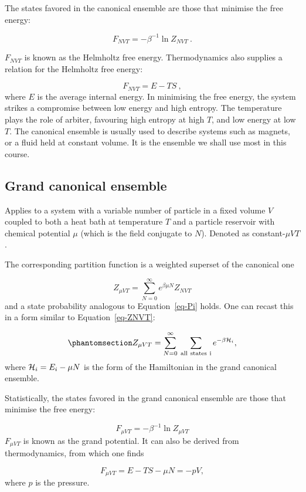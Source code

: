 \documentclass[
  letterpaper,
  enabledeprecatedfontcommands]{report}
\begin{document}
The states favored in the canonical ensemble are those that minimise the
free energy:

\[
F_{NVT}=-\beta^{-1}\ln Z_{NVT}\:.
\]

\(F_{NVT}\) is known as the Helmholtz free energy. Thermodynamics also
supplies a relation for the Helmholtz free energy:

\[
F_{NVT}=E-TS\:,
\] where \(E\) is the average internal energy. In minimising the free
energy, the system strikes a compromise between low energy and high
entropy. The temperature plays the role of arbiter, favouring high
entropy at high \(T\), and low energy at low \(T\). The canonical
ensemble is usually used to describe systems such as magnets, or a fluid
held at constant volume. It is the ensemble we shall use most in this
course.

\subsection*{Grand canonical ensemble}\label{sec-grandcanonical}

Applies to a system with a variable number of particle in a fixed volume
\(V\) coupled to both a heat bath at temperature \(T\) and a particle
reservoir with chemical potential \(\mu\) (which is the field conjugate
to \(N\)). Denoted as constant-\(\mu VT\).

The corresponding partition function is a weighted superset of the
canonical one

\[
Z_{\mu VT}=\sum_{N=0}^\infty e^{\beta\mu N}Z_{NVT}
\] and a state probability analogous to Equation~\ref{eq-Pi} holds. One
can recast this in a form similar to Equation~\ref{eq-ZNVT}:

\begin{equation}\phantomsection\label{eq-ZmuVT}{
Z_{\mu VT}=\sum_{N=0}^\infty\:\sum_{\rm all~states~i}e^{-\beta {\cal H}_i},
}\end{equation} where \({\cal H}_i=E_i-\mu N\) is the form of the
Hamiltonian in the grand canonical ensemble.

Statistically, the states favored in the grand canonical ensemble are
those that minimise the free energy:

\[
F_{\mu VT}=-\beta^{-1}\ln Z_{\mu VT}
\] \(F_{\mu VT}\) is known as the grand potential. It can also be
derived from thermodynamics, from which one finds

\[
F_{\mu VT}=E-TS-\mu N=-pV,
\] where \(p\) is the pressure.
\end{document}
